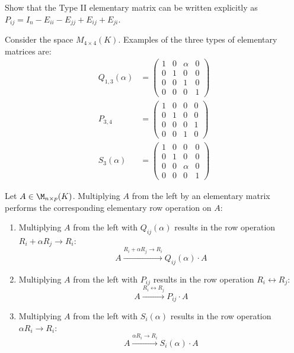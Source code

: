 \begin{exercise}
Show that the Type II elementary matrix can be written explicitly as $P_{ij} = I_n - E_{ii} - E_{jj} + E_{ij} + E_{ji}$.
\end{exercise}

\begin{example}
Consider the space $M_{4 \times 4}(K)$. Examples of the three types of elementary matrices are:
\begin{align*}
    Q_{1,3}(\alpha) &= \begin{pmatrix} 1 & 0 & \alpha & 0 \\ 0 & 1 & 0 & 0 \\ 0 & 0 & 1 & 0 \\ 0 & 0 & 0 & 1 \end{pmatrix} \\
    P_{3,4} &= \begin{pmatrix} 1 & 0 & 0 & 0 \\ 0 & 1 & 0 & 0 \\ 0 & 0 & 0 & 1 \\ 0 & 0 & 1 & 0 \end{pmatrix} \\
    S_3(\alpha) &= \begin{pmatrix} 1 & 0 & 0 & 0 \\ 0 & 1 & 0 & 0 \\ 0 & 0 & \alpha & 0 \\ 0 & 0 & 0 & 1 \end{pmatrix}
\end{align*}
\end{example}

\begin{lemma}
\label{lemma:row_operations_matrix_multiplication}
Let $A \in \M_{n \times p}(K)$. Multiplying $A$ from the left by an elementary matrix performs the corresponding elementary row operation on $A$:
\begin{enumerate}
    \item Multiplying $A$ from the left with $Q_{ij}(\alpha)$ results in the row operation $R_i + \alpha R_j \longrightarrow R_i$:
    \begin{equation*}
        A \xrightarrow{R_i + \alpha R_j \longrightarrow R_i} Q_{ij}(\alpha) \cdot A
    \end{equation*}
    \item Multiplying $A$ from the left with $P_{ij}$ results in the row operation $R_i \leftrightarrow R_j$:
    \begin{equation*}
        A \xrightarrow{R_i \leftrightarrow R_j} P_{ij} \cdot A
    \end{equation*}
    \item Multiplying $A$ from the left with $S_i(\alpha)$ results in the row operation $\alpha R_i \longrightarrow R_i$:
    \begin{equation*}
        A \xrightarrow{\alpha R_i \longrightarrow R_i} S_i(\alpha) \cdot A
    \end{equation*}
\end{enumerate}
\end{lemma}

